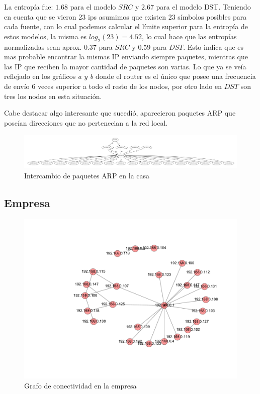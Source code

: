 La entrop\'ia fue: $1.68$ para el modelo $SRC$ y $2.67$ para el modelo DST.
Teniendo en cuenta que se vieron 23 ips asumimos que existen 23 s\'imbolos
posibles para cada fuente, con lo cual podemos calcular el l\'imite
superior para la entrop\'ia de estos modelos, la misma es $log_2(23)=4.52$, lo 
cual hace que las entrop\'ias normalizadas sean aprox. $0.37$ para $SRC$ y 
$0.59$ para $DST$. Esto indica que es mas probable encontrar la mismas 
IP enviando siempre paquetes, mientras que las IP que reciben la mayor
cantidad de paquetes son varias. Lo que ya se ve\'ia reflejado en los gr\'aficos
\emph{a y b} donde el router es el \'unico que posee una frecuencia de
env\'io 6 veces superior a todo el resto de los nodos, por otro lado en $DST$
son tres los nodos en esta situaci\'on.

Cabe destacar algo interesante que sucedi\'o, aparecieron paquetes ARP que
pose\'ian direcciones que no pertenecian a la red local.


\begin{figure}[!h]
	\begin{center}
		  \includegraphics[scale=0.3]{resultados/casa/conectividad.pdf}
		  \caption{Intercambio de paquetes ARP en la casa}
		  \label{fig:contra1}
	\end{center}
\end{figure}


\subsection{Empresa}

\begin{figure}[!h]
	\begin{center}
		  \includegraphics[scale=0.6]{resultados/empresa/conectividadNX.pdf}
		  \caption{Grafo de conectividad en la empresa}
		  \label{fig:contra1}
	\end{center}
\end{figure}

